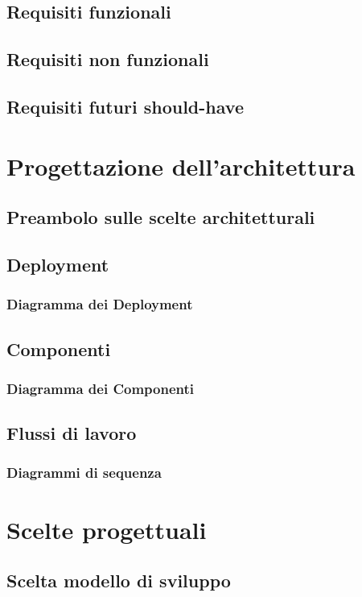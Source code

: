 \documentclass[12pt, a4paper]{article}
\begin{document}
\subsection{Requisiti funzionali}
\subsection{Requisiti non funzionali}
\subsection{Requisiti futuri should-have}

\newpage
\section{Progettazione dell'architettura}
\subsection{Preambolo sulle scelte architetturali}
\subsection{Deployment}
\subsubsection{Diagramma dei Deployment}
\subsection{Componenti}
\subsubsection{Diagramma dei Componenti}
\subsection{Flussi di lavoro}
\subsubsection{Diagrammi di sequenza}

\newpage

\section{Scelte progettuali}
\subsection{Scelta modello di sviluppo}
\end{document}
